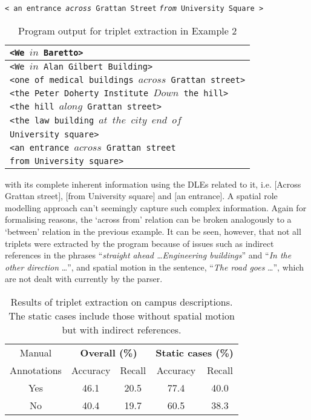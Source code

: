 \documentclass{sig-alternate}
\begin{document}
\texttt{< an entrance \textit{across} Grattan Street} \texttt{\textit{from} University Square >}
\begin{table}
\begin{tabular}{|l|}
\hline
\texttt{<We $in$ Baretto>}\\ \hline
\texttt{<We $in$  Alan Gilbert Building>}\\ \hline
\texttt{<one of medical buildings $across$ Grattan street>}\\ \hline
\texttt{<the Peter Doherty Institute $Down$ the hill>}\\ \hline
\texttt{<the hill $along$ Grattan street>}\\ \hline
\texttt{<the law building $at$  $the$ $city$ $end$ $of$ }\\
\texttt{University square>}\\ \hline
\texttt{<an entrance $across$  Grattan street} \\
\texttt{from University square>}\\ \hline
\end{tabular}
\caption{Program output for triplet extraction in Example 2}
\label{table:ex2}
\end{table}
with its complete inherent information using the DLEs related to it, i.e. $[$Across Grattan street$]$, $[$from University square$]$ and $[$an entrance$]$. A spatial role modelling approach can't seemingly capture such complex information. Again for formalising reasons, the `across from' relation can be broken analogously to a `between' relation in the previous example. It can be seen, however, that not all triplets were extracted by the program because of issues such as indirect references in the phrases ``\textit{straight ahead \dots Engineering buildings}'' and ``\textit{In the other direction} \dots'', and spatial motion in the sentence, ``\textit{The road goes} \dots'', which are not dealt with currently by the parser.
\begin{table}
\centering
\begin{tabular}{|c|c|c|c|c|} \hline
Manual&\multicolumn{2}{|c|}{\textbf{Overall (\%)}}&\multicolumn{2}{|c|}{\textbf{Static cases (\%)}} \\ \cline{2-5}
Annotations&Accuracy&Recall&Accuracy&Recall\\ \cline{1-5}
Yes&46.1&20.5&77.4&40.0\\\hline
No&40.4&19.7&60.5&38.3\\\hline
\end{tabular}
\caption{Results of triplet extraction on campus descriptions. The static cases include those without spatial motion but with indirect references.}
\label{table:stats}
\end{table}
\end{document}
